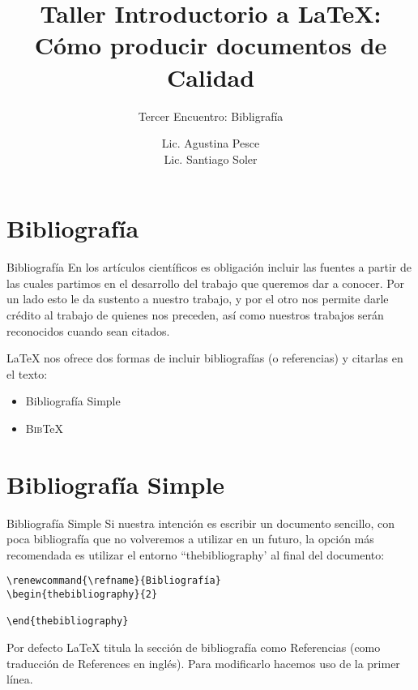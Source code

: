 \documentclass[11pt]{beamer}
\author{Lic. Agustina Pesce \\ Lic. Santiago Soler}
\title[Taller de {\LaTeX}]{Taller Introductorio a {\LaTeX}: \\ Cómo producir documentos de Calidad}
\subtitle{Tercer Encuentro: Bibligrafía}
\date{}
\begin{document}
\maketitle

\section{Bibliografía}

\begin{frame}{Bibliografía}
En los artículos científicos es obligación incluir las fuentes a partir de las cuales partimos en el desarrollo del trabajo que queremos dar a conocer. Por un lado esto le da sustento a nuestro trabajo, y por el otro nos permite darle crédito al trabajo de quienes nos preceden, así como nuestros trabajos serán reconocidos cuando sean citados.

\LaTeX{} nos ofrece dos formas de incluir bibliografías (o referencias) y citarlas en el texto:
\begin{itemize}
\item{Bibliografía Simple}
\item{\textsc{Bib}\TeX{}}
\end{itemize}
\end{frame}

\section{Bibliografía Simple}

\begin{frame}[fragile]{Bibliografía Simple}
Si nuestra intención es escribir un documento sencillo, con poca bibliografía que no volveremos a utilizar en un futuro, la opción más recomendada es utilizar el entorno ``thebibliography' al final del documento:

{\color{new_green} \scriptsize
\begin{verbatim}
\renewcommand{\refname}{Bibliografía}
\begin{thebibliography}{2}

\end{thebibliography}
\end{verbatim}
}

Por defecto \LaTeX{} titula la sección de bibliografía como Referencias (como traducción de References en inglés). Para modificarlo hacemos uso de la primer línea.
\end{frame}
\end{document}
